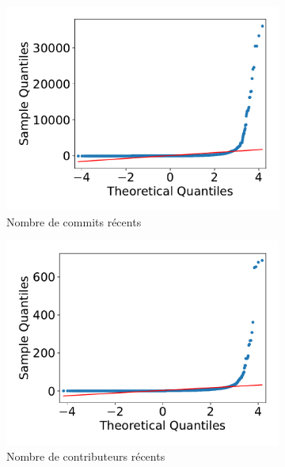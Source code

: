 \begin{figure}[ht]
    \begin{subfigure}[t]{0.3\textwidth}
        \includegraphics[width=\textwidth]{../experiment/data_analysis/recentCommitCount_qqplot}
        \caption{Nombre de \glspl{commit} récents}
    \end{subfigure}
    \begin{subfigure}[t]{0.3\textwidth}
        \includegraphics[width=\textwidth]{../experiment/data_analysis/recentContributorCount_qqplot}
        \caption{Nombre de contributeurs récents}
    \end{subfigure}%
    \begin{subfigure}[t]{0.3\textwidth}

\end{subfigure}
\end{figure}
